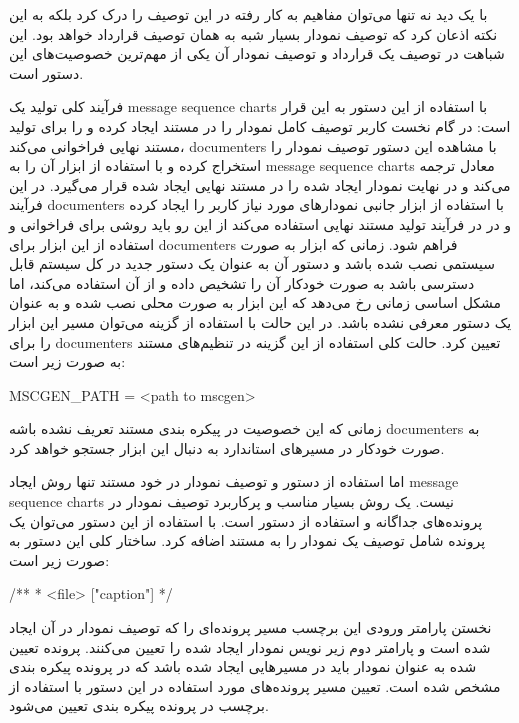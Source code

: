 با یک دید نه تنها می‌توان مفاهیم به کار رفته در این توصیف را درک کرد بلکه به این
نکته اذعان کرد که توصیف نمودار بسیار شبه به همان توصیف قرارداد خواهد بود. این
شباهت در توصیف یک قرارداد و توصیف نمودار آن یکی از مهم‌ترین خصوصیت‌های این دستور
است.


فرآیند کلی تولید یک \glspl{message sequence chart} با استفاده از این دستور به
این قرار است: در گام نخست کاربر توصیف کامل نمودار را در مستند ایجاد کرده و
 را برای تولید مستند نهایی فراخوانی می‌کند، \glspl{documenter} با
مشاهده این دستور توصیف نمودار را استخراج کرده و با استفاده از ابزار 
آن را به \glspl{message sequence chart} معادل ترجمه می‌کند و در نهایت نمودار
ایجاد شده را در مستند نهایی ایجاد شده قرار می‌گیرد. در این فرآیند
\glspl{documenter} با استفاده از ابزار جانبی  نمودارهای مورد نیاز
کاربر را ایجاد کرده و در در فرآیند تولید مستند نهایی استفاده می‌کند از این رو
باید روشی برای فراخوانی و استفاده از این ابزار برای \glspl{documenter} فراهم
شود. زمانی که ابزار  به صورت سیستمی نصب شده باشد و دستور آن به عنوان
یک دستور جدید در کل سیستم قابل دسترسی باشد  به صورت خودکار آن را
تشخیص داده و از آن استفاده می‌کند، اما مشکل اساسی زمانی رخ می‌دهد که این ابزار
به صورت محلی نصب شده و به عنوان یک دستور معرفی نشده باشد. در این حالت با استفاده
از گزینه  می‌توان مسیر این ابزار را برای \glspl{documenter}
تعیین کرد. حالت کلی استفاده از این گزینه در تنظیم‌های مستند به صورت زیر است:

\begin{Shell}
MSCGEN_PATH = <path to mscgen>
\end{Shell}

زمانی که این خصوصیت در پیکره بندی مستند تعریف نشده باشه \glspl{documenter} به
صورت خودکار در مسیرهای استاندارد به دنبال این ابزار جستجو خواهد کرد.

اما استفاده از دستور  و توصیف نمودار در خود مستند تنها روش ایجاد
\glspl{message sequence chart} نیست. یک روش بسیار مناسب و پرکاربرد توصیف نمودار
در پرونده‌های جداگانه و استفاده از دستور  است. با استفاده از این
دستور می‌توان یک پرونده شامل توصیف یک نمودار را به مستند اضافه کرد. ساختار کلی
این دستور به صورت زیر است:

\begin{C++}
 /**
  * \mscfile <file> ["caption"]
  */
\end{C++}

نخستن پارامتر ورودی این برچسب مسیر پرونده‌ای را که توصیف نمودار در
آن ایجاد شده است و پارامتر دوم زیر نویس نمودار ایجاد شده را تعیین
می‌کنند. پرونده تعیین شده به عنوان نمودار باید در مسیرهایی ایجاد شده باشد که در
پرونده پیکره بندی مشخص شده است. تعیین مسیر پرونده‌های مورد استفاده در این دستور
با استفاده از برچسب  در پرونده پیکره بندی تعیین می‌شود.


